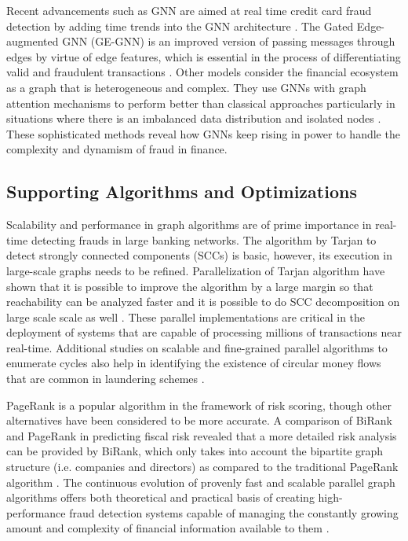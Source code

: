 \documentclass[lettersize,journal]{IEEEtran}
\begin{document}
Recent advancements such as GNN are aimed at real time credit card fraud detection by adding time trends into the GNN architecture \cite{b19}. The Gated Edge-augmented GNN (GE-GNN) is an improved version of passing messages through edges by virtue of edge features, which is essential in the process of differentiating valid and fraudulent transactions \cite{b20}. Other models consider the financial ecosystem as a graph that is heterogeneous and complex. They use GNNs with graph attention mechanisms to perform better than classical approaches particularly in situations where there is an imbalanced data distribution and isolated nodes \cite{b21, b22, b23}. These sophisticated methods reveal how GNNs keep rising in power to handle the complexity and dynamism of fraud in finance.

\subsection{Supporting Algorithms and Optimizations}
Scalability and performance in graph algorithms are of prime importance in real-time detecting frauds in large banking networks. The algorithm by Tarjan to detect strongly connected components (SCCs) is basic, however, its execution in large-scale graphs needs to be refined. Parallelization of Tarjan algorithm have shown that it is possible to improve the algorithm by a large margin so that reachability can be analyzed faster and it is possible to do SCC decomposition on large scale scale as well \cite{b24, b25}. These parallel implementations are critical in the deployment of systems that are capable of processing millions of transactions near real-time. Additional studies on scalable and fine-grained parallel algorithms to enumerate cycles also help in identifying the existence of circular money flows that are common in laundering schemes \cite{b27}.

PageRank is a popular algorithm in the framework of risk scoring, though other alternatives have been considered to be more accurate. A comparison of BiRank and PageRank in predicting fiscal risk revealed that a more detailed risk analysis can be provided by BiRank, which only takes into account the bipartite graph structure (i.e. companies and directors) as compared to the traditional PageRank algorithm \cite{b26}. The continuous evolution of provenly fast and scalable parallel graph algorithms offers both theoretical and practical basis of creating high-performance fraud detection systems capable of managing the constantly growing amount and complexity of financial information available to them \cite{b28}.
\end{document}
